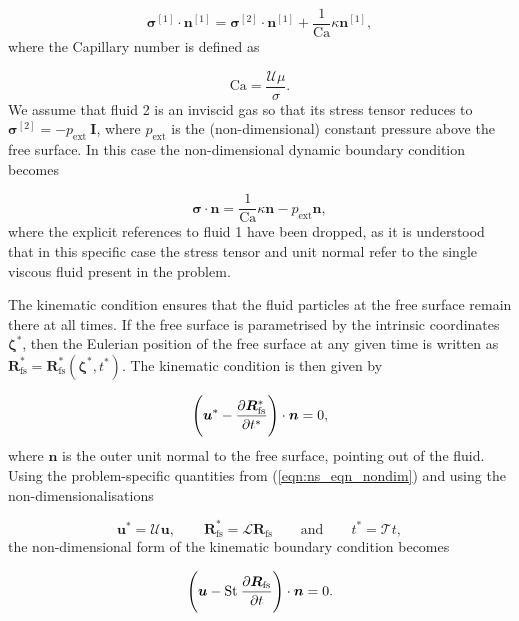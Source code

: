 \documentclass[aip,graphicx]{revtex4-1}
\newcommand{\sym}[1]{\text{#1}} \newcommand{\dif}{\mathrm{d}}
\newcommand{\vect}[1]{\bm{#1}}
\begin{document}
\begin{equation}
 \vect{\sigma}^{[1]} \cdot \vect{n}^{[1]} = \vect{\sigma}^{[2]} \cdot
 \vect{n}^{[1]} + \frac{1}{\sym{Ca}} \kappa \vect{n}^{[1]},
\end{equation}
where the Capillary number is defined as

\begin{equation}
 \sym{Ca} = \frac{\mathcal{U} \mu}{\sigma}.
\end{equation}
We assume that fluid 2 is an inviscid gas so that its stress tensor
reduces to $\vect{\sigma}^{[2]}=-p_{\sym{ext}} \: \vect{I}$, where
$p_{\sym{ext}}$ is the (non-dimensional) constant pressure above the
free surface.  In this case the non-dimensional dynamic boundary
condition becomes

\begin{equation}
 \vect{\sigma} \cdot \vect{n} = \frac{1}{\sym{Ca}} \kappa \vect{n} -
 p_{\sym{ext}} \vect{n},
 \label{eqn:ns_eqn_dynamic_fs_bc_non_dim}
\end{equation}
where the explicit references to fluid 1 have been dropped, as it is
understood that in this specific case the stress tensor and unit
normal refer to the single viscous fluid present in the problem.

The kinematic condition ensures that the fluid particles at the free
surface remain there at all times.  If the free surface is
parametrised by the intrinsic coordinates $\vect{\zeta}^*$, then the
Eulerian position of the free surface at any given time is written as
$\vect{R}_{\sym{fs}}^*=\vect{R}_{\sym{fs}}^*(\vect{\zeta}^*,t^*)$.
The kinematic condition is then given by

\begin{equation}
 \Bigg( \vect{u}^* - \pder[\vect{R}_{\sym{fs}}^*]{t^*} \Bigg) \cdot
 \vect{n} = 0,
\end{equation}
where $\vect{n}$ is the outer unit normal to the free surface,
pointing out of the fluid.  Using the problem-specific quantities from
(\ref{eqn:ns_eqn_nondim}) and using the non-dimensionalisations

\begin{equation}
 \vect{u}^* = \mathcal{U} \vect{u}, \qquad \vect{R}_{\sym{fs}}^* =
 \mathcal{L} \vect{R}_{\sym{fs}} \qquad \text{and} \qquad
 t^*=\mathcal{T} t,
\end{equation}
the non-dimensional form of the kinematic boundary condition becomes

\begin{equation}
 \Bigg( \vect{u} - \sym{St} \: \pder[\vect{R}_{\sym{fs}}]{t} \Bigg)
 \cdot \vect{n} = 0.
 \label{eqn:ns_eqn_kinematic_fs_bc_non_dim}
\end{equation}
\end{document}
